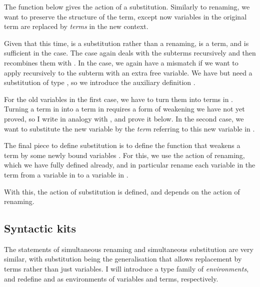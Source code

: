 The  function below gives the action of a substitution.
Similarly to renaming, we want to preserve the structure of the term, except
now variables in the original term are replaced by \emph{terms} in the new
context.

\substitute{}

Given that this time, \AgdaBound{$\rho$} is a substitution rather than a
renaming, \AgdaBound{$\rho$}  is a term, and is sufficient in the
 case.
The  case again deals with the subterms
recursively and then recombines them with .
In the  case, we again have a mismatch if we
want to apply  recursively to the subterm  with
an extra free variable.
We have \AgdaBound{$\rho$} \AgdaSymbol{:} \SubGD{} but need a substitution of
type \SubGADA{}, so we introduce the auxiliary definition
.

\bindSub{}

For the old variables in the first case, we have \AgdaBound{$\rho$} to turn
them into terms in \AgdaBound{$\Gamma$}.
Turning a term in \AgdaBound{$\Gamma$} into a term in \GTh{} requires a form
of weakening we have not yet proved, so I write  in analogy
with , and prove it below.
In the second case, we want to substitute the new variable by the \emph{term}
referring to this new variable in \GTh{}.

The final piece to define substitution is to define the function that weakens
a term by some newly bound variables \AgdaBound{$\Delta$}.
For this, we use the action of renaming, which we have fully defined already,
and in particular rename each variable in the term from a variable in
\AgdaBound{$\Gamma$} to a variable in \GD{}.

\leftTerm{}

With this, the action of substitution is defined, and depends on the action
of renaming.

\subsection{Syntactic kits}\label{sec:syntactic-kits}

The statements of simultaneous renaming and simultaneous substitution are
very similar, with substitution being the generalisation that allows
replacement by terms rather than just variables.
I will introduce a type family  of \emph{environments}, and
redefine  and  as environments of
variables and terms, respectively.


